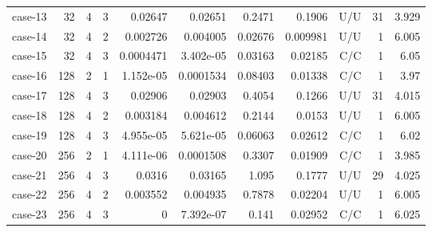 \begin{longtable}{lrrrrrrrrrr}
case-13 & 32 & 4 & 3 & 0.02647 & 0.02651 & 0.2471 & 0.1906 & U/U & 31 & 3.929 \\
case-14 & 32 & 4 & 2 & 0.002726 & 0.004005 & 0.02676 & 0.009981 & U/U & 1 & 6.005 \\
case-15 & 32 & 4 & 3 & 0.0004471 & 3.402e-05 & 0.03163 & 0.02185 & C/C & 1 & 6.05 \\
case-16 & 128 & 2 & 1 & 1.152e-05 & 0.0001534 & 0.08403 & 0.01338 & C/C & 1 & 3.97 \\
case-17 & 128 & 4 & 3 & 0.02906 & 0.02903 & 0.4054 & 0.1266 & U/U & 31 & 4.015 \\
case-18 & 128 & 4 & 2 & 0.003184 & 0.004612 & 0.2144 & 0.0153 & U/U & 1 & 6.005 \\
case-19 & 128 & 4 & 3 & 4.955e-05 & 5.621e-05 & 0.06063 & 0.02612 & C/C & 1 & 6.02 \\
case-20 & 256 & 2 & 1 & 4.111e-06 & 0.0001508 & 0.3307 & 0.01909 & C/C & 1 & 3.985 \\
case-21 & 256 & 4 & 3 & 0.0316 & 0.03165 & 1.095 & 0.1777 & U/U & 29 & 4.025 \\
case-22 & 256 & 4 & 2 & 0.003552 & 0.004935 & 0.7878 & 0.02204 & U/U & 1 & 6.005 \\
case-23 & 256 & 4 & 3 & 0 & 7.392e-07 & 0.141 & 0.02952 & C/C & 1 & 6.025 \\
\bottomrule\end{longtable}

